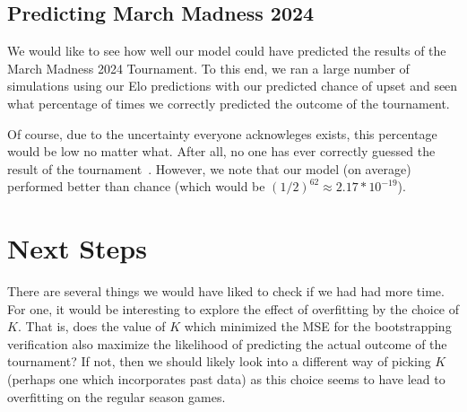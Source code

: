 \documentclass{article}
\begin{document}
\subsection{Predicting March Madness 2024}
We would like to see how well our model could have predicted the results of the March Madness 2024 Tournament. To this end, we ran a large number of simulations using our Elo predictions with our predicted chance of upset and seen what percentage of times we correctly predicted the outcome of the tournament.

Of course, due to the uncertainty everyone acknowleges exists, this percentage would be low no matter what. After all, no one has ever correctly guessed the result of the tournament~\cite{cbsnewsAnyoneEver}. However, we note that our model (on average) performed better than chance (which would be $(1/2)^{62} \approx 2.17 * 10^{-19}$).

\section{Next Steps}
There are several things we would have liked to check if we had had more time. For one, it would be interesting to explore the effect of overfitting by the choice of $K$. That is, does the value of $K$ which minimized the MSE for the bootstrapping verification also maximize the likelihood of predicting the actual outcome of the tournament? If not, then we should likely look into a different way of picking $K$ (perhaps one which incorporates past data) as this choice seems to have lead to overfitting on the regular season games. 



\end{document}
